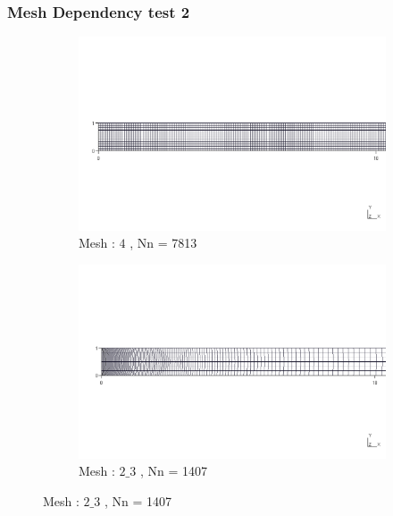 \documentclass[9pt]{beamer}
\begin{document}
\begin{frame}
\begin{figure}[h!]
\end{figure}

\end{frame}



\begin{frame}
\frametitle{Mesh Dependency test 2}
\begin{figure}[h!]
\centering

\end{figure}
\end{frame}


\begin{frame}
\begin{figure}[h!]
\centering

\begin{subfigure}{1\textwidth}

\includegraphics[width=\linewidth,trim={0cm 9cm 0cm 9cm},clip]{Mesh_Dependency/meshes/4_zoomed.png}
\caption{Mesh : $4$ , Nn = 7813 }

\end{subfigure} \vfill


\begin{subfigure}{1\textwidth}

\includegraphics[width=\linewidth,trim={0cm 9cm 0cm 9cm},clip]{Mesh_Dependency/meshes/2_3_zoomed.png}
\caption{Mesh : $2\_3$ , Nn = 1407 }


\end{subfigure}
\end{figure}
\end{frame}
\end{document}

